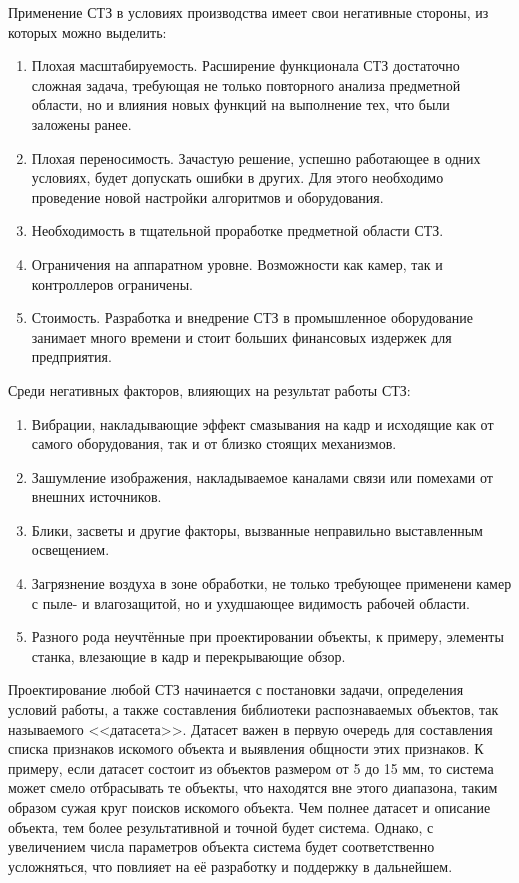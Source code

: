 Применение СТЗ в условиях производства имеет свои негативные стороны, из которых можно выделить:

\begin{enumerate}
	\item Плохая масштабируемость. Расширение функционала СТЗ достаточно сложная задача, требующая не только повторного анализа предметной области, но и влияния новых функций на выполнение тех, что были заложены ранее.
	\item Плохая переносимость. Зачастую решение, успешно работающее в одних условиях, будет допускать ошибки в других. Для этого необходимо проведение новой настройки алгоритмов и оборудования.
	\item Необходимость в тщательной проработке предметной области СТЗ.
	\item Ограничения на аппаратном уровне. Возможности как камер, так и контроллеров ограничены.
	\item Стоимость. Разработка и внедрение СТЗ в промышленное оборудование занимает много времени и стоит больших финансовых издержек для предприятия.
\end{enumerate}

Среди негативных факторов, влияющих на результат работы СТЗ:

\begin{enumerate}
	\item Вибрации, накладывающие эффект смазывания на кадр и исходящие как от самого оборудования, так и от близко стоящих механизмов.
	\item Зашумление изображения, накладываемое каналами связи или помехами от внешних источников.
	\item Блики, засветы и другие факторы, вызванные неправильно выставленным освещением.
	\item Загрязнение воздуха в зоне обработки, не только требующее применени камер с пыле- и влагозащитой, но и ухудшающее видимость рабочей области.
	\item Разного рода неучтённые при проектировании объекты, к примеру, элементы станка, влезающие в кадр и перекрывающие обзор.
\end{enumerate}

Проектирование любой СТЗ начинается с постановки задачи, определения условий работы, а также составления библиотеки распознаваемых объектов, так называемого <<датасета>>. Датасет важен в первую очередь для составления списка признаков искомого объекта и выявления общности этих признаков. К примеру, если датасет состоит из объектов размером от 5 до 15 мм, то система может смело отбрасывать те объекты, что находятся вне этого диапазона, таким образом сужая круг поисков искомого объекта. Чем полнее датасет и описание объекта, тем более результативной и точной будет система. Однако, с увеличением числа параметров объекта система будет соответственно усложняться, что повлияет на её разработку и поддержку в дальнейшем.

